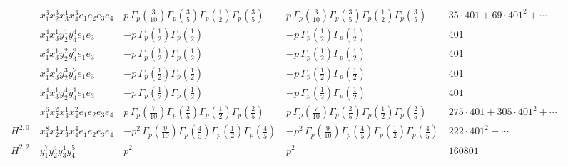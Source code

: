\documentclass[11pt]{article}
\begin{document}
\begin{table}[ht]
{\begin{tabular}{@{}lllll@{}}
 & $x_{1}^{3} x_{2}^{3} x_{3}^{1} x_{4}^{3}  e_{1} e_{2} e_{3} e_{4}$ & $p \, \Gamma_p \left( \frac{3}{10} \right) \Gamma_p \left( \frac{3}{5} \right) \Gamma_p \left( \frac{1}{2} \right) \Gamma_p \left( \frac{3}{5} \right)$ & $p \, \Gamma_p \left( \frac{3}{10} \right) \Gamma_p \left( \frac{3}{5} \right) \Gamma_p \left( \frac{1}{2} \right) \Gamma_p \left( \frac{3}{5} \right)$ & $35{\cdot}401{+}69{\cdot}401^{2}{+}\cdots$ \\
 & $x_{1}^{4} x_{3}^{1} y_{2}^{1} y_{4}^{4} e_{1} e_{3}$ & $- p \, \Gamma_p \left( \frac{1}{2} \right) \Gamma_p \left( \frac{1}{2} \right)$ & $- p \, \Gamma_p \left( \frac{1}{2} \right) \Gamma_p \left( \frac{1}{2} \right)$ & $401$ \\
 & $x_{1}^{4} x_{3}^{1} y_{2}^{2} y_{4}^{3} e_{1} e_{3}$ & $- p \, \Gamma_p \left( \frac{1}{2} \right) \Gamma_p \left( \frac{1}{2} \right)$ & $- p \, \Gamma_p \left( \frac{1}{2} \right) \Gamma_p \left( \frac{1}{2} \right)$ & $401$ \\
 & $x_{1}^{4} x_{3}^{1} y_{2}^{3} y_{4}^{2} e_{1} e_{3}$ & $- p \, \Gamma_p \left( \frac{1}{2} \right) \Gamma_p \left( \frac{1}{2} \right)$ & $- p \, \Gamma_p \left( \frac{1}{2} \right) \Gamma_p \left( \frac{1}{2} \right)$ & $401$ \\
 & $x_{1}^{4} x_{3}^{1} y_{2}^{4} y_{4}^{1} e_{1} e_{3}$ & $- p \, \Gamma_p \left( \frac{1}{2} \right) \Gamma_p \left( \frac{1}{2} \right)$ & $- p \, \Gamma_p \left( \frac{1}{2} \right) \Gamma_p \left( \frac{1}{2} \right)$ & $401$ \\
 & $x_{1}^{6} x_{2}^{2} x_{3}^{1} x_{4}^{2}  e_{1} e_{2} e_{3} e_{4}$ & $p \, \Gamma_p \left( \frac{7}{10} \right) \Gamma_p \left( \frac{2}{5} \right) \Gamma_p \left( \frac{1}{2} \right) \Gamma_p \left( \frac{2}{5} \right)$ & $p \, \Gamma_p \left( \frac{7}{10} \right) \Gamma_p \left( \frac{2}{5} \right) \Gamma_p \left( \frac{1}{2} \right) \Gamma_p \left( \frac{2}{5} \right)$ & $275{\cdot}401{+}305{\cdot}401^{2}{+}\cdots$ \\
\midrule
$H^{2,0}$ & $x_{1}^{8} x_{2}^{4} x_{3}^{1} x_{4}^{4}  e_{1} e_{2} e_{3} e_{4}$ & $- p^{2} \, \Gamma_p \left( \frac{9}{10} \right) \Gamma_p \left( \frac{4}{5} \right) \Gamma_p \left( \frac{1}{2} \right) \Gamma_p \left( \frac{4}{5} \right)$ & $- p^{2} \, \Gamma_p \left( \frac{9}{10} \right) \Gamma_p \left( \frac{4}{5} \right) \Gamma_p \left( \frac{1}{2} \right) \Gamma_p \left( \frac{4}{5} \right)$ & $222{\cdot}401^{2}{+}\cdots$ \\
\midrule
$H^{2,2}$ & $y_{1}^{7} y_{2}^{4} y_{3}^{1} y_{4}^{5}$ & $p^{2} \,$ & $p^{2} \,$ & $160801$ \\
\bottomrule
\end{tabular}
}
\renewcommand{\arraystretch}{1.0}
\end{table}
\end{document}
